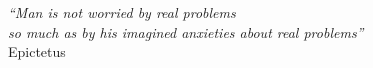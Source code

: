 \cleardoublepage
\thispagestyle{plain}

\vspace*{8cm}

\begin{flushright}
	\textsl{``Man is not worried by real problems \\
		so much as by his imagined anxieties about real problems''} \\
	\vspace*{1.5cm}
	Epictetus
\end{flushright}

